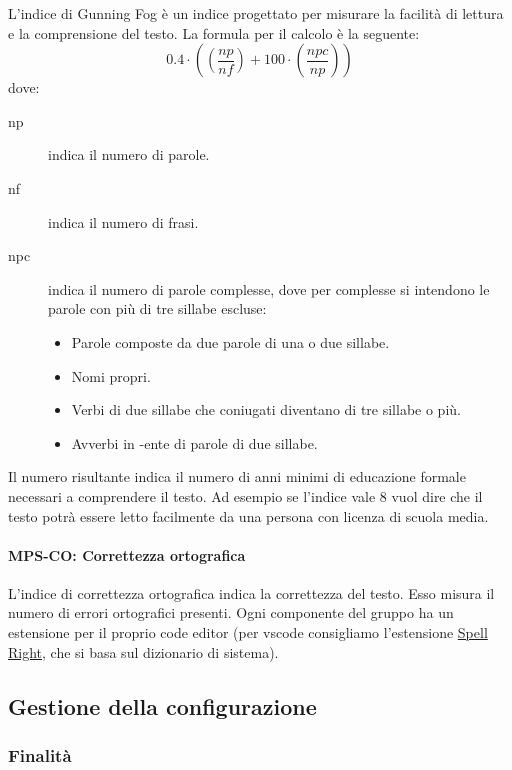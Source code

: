 \documentclass[../norme-di-progetto.tex]{subfiles}
\begin{document}
L'indice di Gunning Fog è un indice progettato per misurare la facilità di lettura e la comprensione del testo. La formula per il calcolo è la seguente:
\[
  0.4\cdot((\frac{np}{nf})+100\cdot(\frac{npc}{np}))
\]
dove:
\begin{description}
  \item [np] indica il numero di parole.
  \item [nf] indica il numero di frasi.
  \item [npc] indica il numero di parole complesse, dove per complesse si intendono le parole con più di tre sillabe escluse:
        \begin{itemize}
          \item Parole composte da due parole di una o due sillabe.
          \item Nomi propri.
          \item Verbi di due sillabe che coniugati diventano di tre sillabe o più.
          \item Avverbi in -ente di parole di due sillabe.
        \end{itemize}
\end{description}
Il numero risultante indica il numero di anni minimi di educazione formale necessari a comprendere il testo. Ad esempio se l'indice vale 8 vuol dire che il testo potrà essere letto facilmente da una persona con licenza di scuola media.

\paragraph{MPS-CO\@: Correttezza ortografica}%
\label{par:MPS-CO_correttezza_ortografica}

L'indice di correttezza ortografica indica la correttezza del testo.
Esso misura il numero di errori ortografici presenti.
Ogni componente del gruppo ha un estensione per il proprio code editor (per vscode consigliamo l'estensione \href{https://marketplace.visualstudio.com/items?itemName=ban.spellright}{Spell Right}, che si basa sul dizionario di sistema).


\subsection{Gestione della configurazione}%
\label{sub:gestione_della_configurazione}

\subsubsection{Finalità}%
\label{subs:gestione_della_configurazione/finalita}
\end{document}
